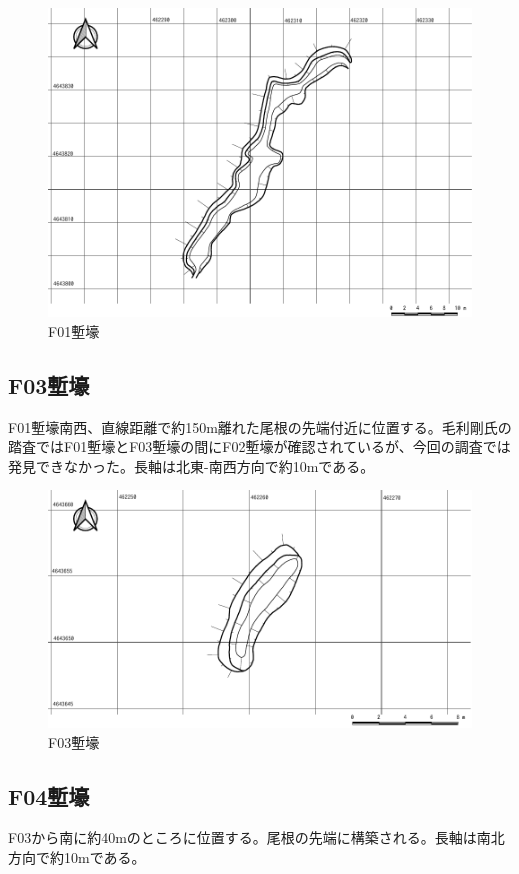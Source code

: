 \documentclass[14Q]{jsarticle}
\begin{document}
\begin{figure}[h]
\centering
\includegraphics[width=160truemm]{fig/F01.pdf}
\caption{F01塹壕}
\label{f01}
\end{figure}

\subsection{F03塹壕}
F01塹壕南西、直線距離で約150m離れた尾根の先端付近に位置する。毛利剛氏の踏査ではF01塹壕とF03塹壕の間にF02塹壕が確認されているが、今回の調査では発見できなかった。長軸は北東-南西方向で約10mである。

\begin{figure}[h]
\centering
\includegraphics[width=160truemm]{fig/F03.pdf}
\caption{F03塹壕}
\label{f01}
\end{figure}

\subsection{F04塹壕}
F03から南に約40mのところに位置する。尾根の先端に構築される。長軸は南北方向で約10mである。
\end{document}
